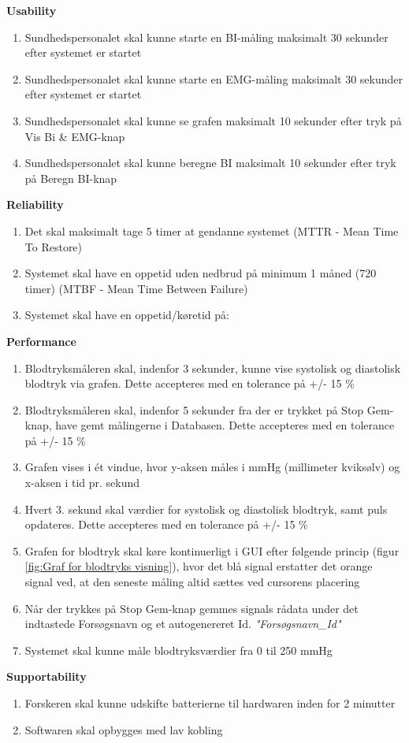 \documentclass[main.tex]{subfiles}
\begin{document}
\textbf{Usability}
\begin{enumerate}
\item Sundhedspersonalet skal kunne starte en BI-måling maksimalt 30 sekunder efter systemet er startet
\item Sundhedspersonalet skal kunne starte en EMG-måling maksimalt 30 sekunder efter systemet er startet
\item Sundhedspersonalet skal kunne se grafen maksimalt 10 sekunder efter tryk på Vis Bi \& EMG-knap
\item Sundhedspersonalet skal kunne beregne BI maksimalt 10 sekunder efter tryk på Beregn BI-knap
\end{enumerate}
                                                                                                
\textbf{Reliability}
\begin{enumerate}
\item Det skal maksimalt tage 5 timer at gendanne systemet (MTTR - Mean Time To Restore)
\item Systemet skal have en oppetid uden nedbrud på minimum 1 måned (720 timer) (MTBF - Mean Time Between Failure)   
\item Systemet skal have en oppetid/køretid på: 
\end{enumerate}

					
\textbf{Performance}
\begin{enumerate}
\item Blodtryksmåleren skal, indenfor 3 sekunder, kunne vise systolisk og diastolisk blodtryk via grafen. Dette accepteres med en tolerance på +/- 15 \%
\item Blodtryksmåleren skal, indenfor 5 sekunder fra der er trykket på Stop Gem-knap, have gemt målingerne i Databasen. Dette accepteres med en tolerance på +/- 15 \%
\item Grafen vises i ét vindue, hvor y-aksen måles i mmHg (millimeter kviksølv) og x-aksen i tid pr. sekund
\item Hvert 3. sekund skal værdier for systolisk og diastolisk blodtryk, samt puls opdateres. Dette accepteres med en tolerance på +/- 15 \%
\item Grafen for blodtryk skal køre kontinuerligt i GUI efter følgende princip (figur \ref{fig:Graf for blodtryks visning}), hvor det blå signal erstatter det orange signal ved, at den seneste måling altid sættes ved cursorens placering


\item Når der trykkes på Stop Gem-knap gemmes signals rådata under det indtastede Forsøgsnavn og et autogenereret Id. \textit{"Forsøgsnavn\_Id"}
\item Systemet skal kunne måle blodtryksværdier fra 0 til 250 mmHg
\end{enumerate}


\textbf{Supportability}
\begin{enumerate}
\item Forskeren skal kunne udskifte batterierne til hardwaren inden for 2 minutter 
\item Softwaren skal opbygges med lav kobling
\end{enumerate}

\newpage
\listoffigures
\newpage
\listoftables
\end{document}
